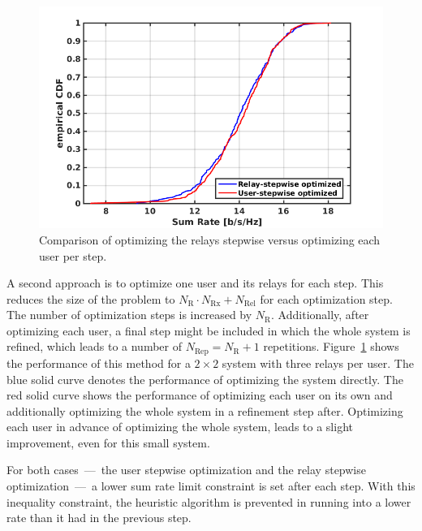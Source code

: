 \begin{figure}[h]
\centering
  \includegraphics[width=0.9\linewidth]{images/stepwise_comparison.png}
\caption{Comparison of optimizing the relays stepwise versus optimizing each user per step.}
\label{fig:uservsrelay_stepwise}
\end{figure}
A second approach is to optimize one user and its relays for each step.
This reduces the size of the problem to $N_\text{R}\cdot N_\text{Rx}+N_\text{Rel}$ for each optimization step.
The number of optimization steps is increased by $N_\text{R}$.
Additionally, after optimizing each user, a final step might be included in which the whole system is refined, which leads to a number of $N_\text{Rep}=N_\text{R}+1$ repetitions.
Figure~\ref{fig:uservsrelay_stepwise} shows the performance of this method for a $2\times2$ system with three relays per user.
The blue solid curve denotes the performance of optimizing the system directly.
The red solid curve shows the performance of optimizing each user on its own and additionally optimizing the whole system in a refinement step after.
Optimizing each user in advance of optimizing the whole system, leads to a slight improvement, even for this small system.

For both cases~---~the user stepwise optimization and the relay stepwise optimization~---~a lower sum rate limit constraint is set after each step.
With this inequality constraint, the heuristic algorithm is prevented in running into a lower rate than it had in the previous step.






